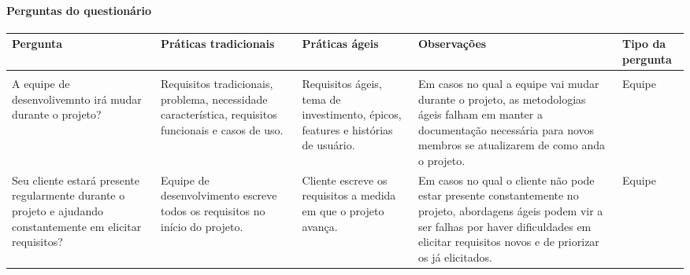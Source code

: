 \paragraph{Perguntas do questionário}
\label{sec:perguntas_do_questinario}
\clearpage
	\begin{longtable}{|p{3.5cm}|p{3.5cm}|p{3.5cm}|p{3.5cm}|p{2cm}|}
		\hline
		\textbf{Pergunta} &
		\textbf{Práticas tradicionais} &
		\textbf{Práticas ágeis} &
		\textbf{Observações} &
		\textbf{Tipo da pergunta}
		\\ \hline
		\endhead

		\hline \multicolumn{5}{|r|}{\longtableendfoot} \\ \hline
		\endfoot

		\endlastfoot

		A equipe de desenvolivemnto irá mudar durante o projeto? &
		Requisitos tradicionais, problema, necessidade característica, requisitos funcionais e casos de uso. &
		Requisitos ágeis, tema de investimento, épicos, features e histórias de usuário. &
		Em casos no qual a equipe vai mudar durante o projeto, as metodologias ágeis falham em manter a documentação necessária para novos membros se atualizarem de como anda o projeto. &
		Equipe
		\\ \hline

		Seu cliente estará presente regularmente durante o projeto e ajudando constantemente em elicitar requisitos? &
		Equipe de desenvolvimento escreve todos os requisitos no início do projeto. &
		Cliente escreve os requisitos a medida em que o projeto avança. &
		Em casos no qual o cliente não pode estar presente constantemente no projeto, abordagens ágeis podem vir a ser falhas por haver dificuldades em elicitar requisitos novos e de priorizar os já elicitados. &
		Equipe
		\\ \hline


\end{longtable}
